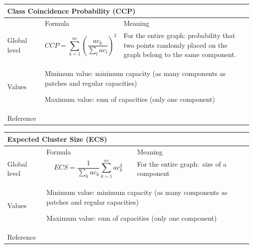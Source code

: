 \documentclass{article}
\begin{document}
\begin{table}[H]
\begin{tabular}{|m{3.24cm}|m{4.4810004cm}m{7.924cm}|}
\hline
\multicolumn{3}{|m{16.044998cm}|}{Class Coincidence Probability
(CCP)}\\\hline
 &
\multicolumn{1}{m{4.4810004cm}|}{Formula} &
Meaning\\\hline
Global level &
\multicolumn{1}{m{4.4810004cm}|}{\begin{equation*}
\mathit{CCP}=\sum
_{k=1}^{\mathit{nc}}{{\left(\frac{{\mathit{ac}}_{k}}{\sum
_{l}{{\mathit{ac}}_{l}}}\right)}^{2}}
\end{equation*}
} &
For the entire graph: probability that two points randomly placed on the
graph belong to the same component.\\\hline
Values &
\multicolumn{2}{m{12.6050005cm}|}{Minimum value: minimum capacity (as
many components as patches and regular capacities)

Maximum value: sum of capacities (only one component)

}\\\hline
Reference &
\multicolumn{2}{m{12.6050005cm}|}{\cite{Pascual2006}}\\\hline
\end{tabular}
\end{table}


\begin{table}[H]
\begin{tabular}{|m{3.24cm}|m{4.4810004cm}m{7.924cm}|}
\hline
\multicolumn{3}{|m{16.044998cm}|}{Expected Cluster Size (ECS)}\\\hline
 &
\multicolumn{1}{m{4.4810004cm}|}{Formula} &
Meaning\\\hline
Global level &
\multicolumn{1}{m{4.4810004cm}|}{\begin{equation*}
\mathit{ECS}=\frac{1}{\sum _{k}{{\mathit{ac}}_{k}}}\sum
_{k=1}^{\mathit{nc}}{{{\mathit{ac}}_{k}^{2}}}
\end{equation*}
} &
For the entire graph:~size of a component 

\\\hline
Values &
\multicolumn{2}{m{12.6050005cm}|}{Minimum value: minimum capacity (as
many components as patches and regular capacities)

Maximum value: sum of capacities (only one component)

}\\\hline
Reference &
\multicolumn{2}{m{12.6050005cm}|}{\cite{OBrien2006}}\\\hline
\end{tabular}
\end{table}
\end{document}
